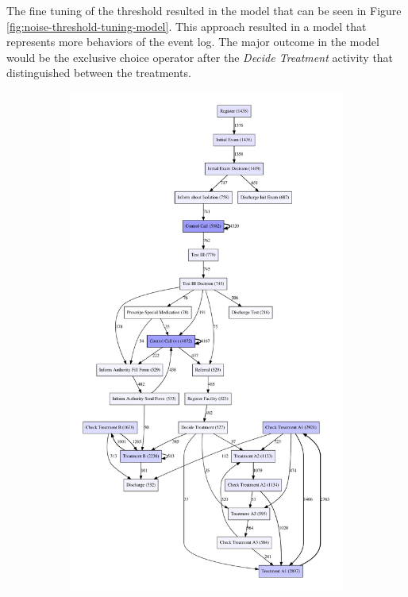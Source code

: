 \documentclass[12pt]{report}
\begin{document}
The fine tuning of the threshold resulted in the model that can be seen in Figure \ref{fig:noise-threshold-tuning-model}. This approach resulted in a model that represents more behaviors of the event log. The major outcome in the model would be the exclusive choice operator after the \emph{Decide Treatment} activity that distinguished between the treatments.

\begin{figure}[h]
    \centering
    \begin{subfigure}[b]{0.2\textwidth}
        \centering
	\includegraphics[width=\textwidth]{figures/q1_d_dfg_noise_threshold_tuning.pdf}

\end{subfigure}
\end{figure}
\end{document}
